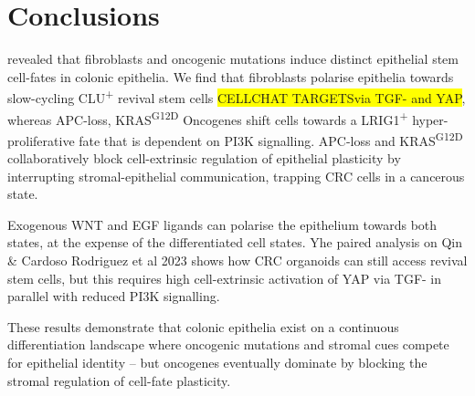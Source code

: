 \section{Conclusions}

revealed that fibroblasts and oncogenic mutations induce distinct epithelial stem cell-fates in colonic epithelia. We find that fibroblasts polarise epithelia towards slow-cycling CLU\textsuperscript{+} revival stem cells \colorbox{yellow}{CELLCHAT TARGETSvia TGF- and YAP}, whereas APC-loss, KRAS\textsuperscript{G12D}
Oncogenes shift cells towards a LRIG1\textsuperscript{+} hyper-proliferative fate that is dependent on PI3K signalling. APC-loss and KRAS\textsuperscript{G12D} collaboratively block cell-extrinsic regulation of epithelial plasticity by interrupting stromal-epithelial communication, trapping CRC cells in a cancerous state.

Exogenous WNT and EGF ligands can polarise the epithelium towards both states, at the expense of the differentiated cell states. Yhe paired analysis on Qin \& Cardoso Rodriguez et al 2023 shows how CRC organoids can still access revival stem cells, but this requires high cell-extrinsic activation of YAP via TGF- in parallel with reduced PI3K signalling. 

These results demonstrate that colonic epithelia exist on a continuous differentiation landscape where oncogenic mutations and stromal cues compete for epithelial identity -- but oncogenes eventually dominate by blocking the stromal regulation of cell-fate plasticity. 



